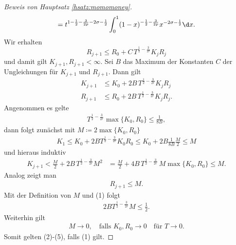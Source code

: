 \begin{proof}[Beweis von Hauptsatz \ref{hsatz:momomoney}]
$$  = t^{1 - \frac{1}{2} - \frac{3}{2p} - 2\sigma - \frac{1}{2}} \int_0^1 (1 - x)^{-\frac{1}{2} - \frac{3}{2p}} x^{-2\sigma - \frac{1}{2}} \d x.
  $$
  Wir erhalten
  $$
  R_{j + 1} \leq R_0 + C\, T^{\frac{1}{2} - \frac{3}{2r}} K_j R_j
  $$
  und damit gilt $K_{j + 1}, R_{j + 1} < \infty$.
  Sei $B$ das Maximum der Konstanten $C$ der Ungleichungen für $K_{j + 1}$ und $R_{j + 1}$.
  Dann gilt
  \begin{align*}
    K_{j + 1} &\leq K_0 + 2 B\, T^{\frac{1}{2} - \frac{3}{2r}} K_j R_j \\
    R_{j + 1} &\leq R_0 + 2 B\, T^{\frac{1}{2} - \frac{3}{2r}} K_j R_j.
  \end{align*}
  Angenommen es gelte
  \begin{align}
    T^{\frac{1}{2} - \frac{3}{2r}} \max\{ K_0, R_0 \} \leq \frac{1}{8B},
  \end{align}
  dann folgt zunächst mit $M \coloneqq 2 \max \{ K_0, R_0 \}$ 
  \begin{align*}
    K_1 \leq K_0 + 2 B T^{\frac{1}{2} - \frac{3}{2r}} K_0 R_0 \leq K_0 + 2 B \frac{1}{8B} \frac{M}{2} \leq M
  \end{align*}
  und hieraus induktiv
  \begin{align}
    K_{j + 1} < \frac{M}{2} + 2 B\, T^{\frac{1}{2} - \frac{3}{2r}} M^2
    &= \frac{M}{2} + 4 B\, T^{\frac{1}{2} - \frac{3}{2r}} \, M \max\{K_0, R_0\}
    \leq M.
  \end{align}
  Analog zeigt man 
  \begin{align}
    R_{j + 1} \leq M.
  \end{align}
  Mit der Definition von $M$ und (1) folgt
  \begin{align}
    2 B T^{\frac{1}{2} - \frac{3}{2r}} M \leq \frac{1}{2}.
  \end{align}
  Weiterhin gilt
  \begin{align}
    M \to 0, \quad\text{falls } K_0, R_0 \to 0 \quad\text{für } T \to 0.
  \end{align}
  Somit gelten (2)-(5), falls (1) gilt.


\end{proof}
